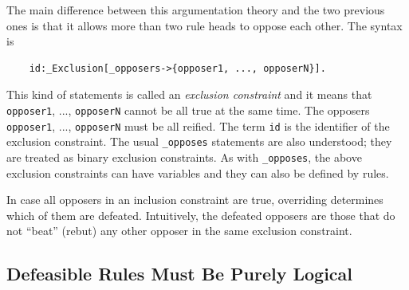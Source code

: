\documentclass[11pt]{article}
\begin{document}
The main difference between this argumentation theory and the two previous
ones is that it allows more than two rule heads to oppose each other.
The syntax is
\begin{verbatim}
    id:_Exclusion[_opposers->{opposer1, ..., opposerN}].
\end{verbatim}
This kind of statements is called an \emph{exclusion constraint} and it
means that {\tt opposer1}, ..., {\tt opposerN} cannot be all true    
at the same time. The opposers {\tt opposer1}, ..., {\tt opposerN} must be
all reified. The term {\tt id} is the identifier of the
exclusion constraint.
The usual {\tt \_opposes} statements are also understood; they are
treated as binary exclusion constraints.
As with {\tt \_opposes}, the above exclusion constraints can have variables
and they can also be defined by rules.

In case all opposers in an inclusion constraint are true, overriding
determines which of them are defeated.  Intuitively, the defeated opposers
are those that do not ``beat'' (rebut) any other opposer in the same
exclusion constraint.


\subsection{Defeasible Rules Must Be Purely Logical}
\end{document}
